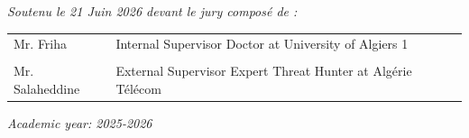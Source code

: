 \documentclass[11pt,a4paper]{report}
\begin{document}
\begin{titlepage}
    \vspace{0.6cm}
    
    \textit{Soutenu le 21 Juin 2026 devant le jury compos\'{e} de :}
    
    \vspace{0.3cm}
    
    \begin{tabular}{ll}
        Mr. Friha \hspace{1.5cm} & Internal Supervisor \hspace{1.5cm} Doctor at University of Algiers 1 \\
        \\
        Mr. Salaheddine \hspace{1.5cm} & External Supervisor \hspace{1.5cm} Expert Threat Hunter at Alg\'{e}rie T\'{e}l\'{e}com
    \end{tabular}
    
    \vspace{0.6cm}
    \textit{Academic year: 2025-2026}
    
\end{titlepage}

\setcounter{page}{1}

\newpage


\newpage


\newpage


\newpage
{}
\tableofcontents

\newpage
{}
{}
\listoftables

\newpage
{}
{}
\listoffigures

\newpage
{}
{}


\newpage
{}
\setcounter{page}{1}




\newpage


\newpage


\newpage


\appendix
\newpage


\newpage


\newpage


\newpage
{}
{}


\end{document}
